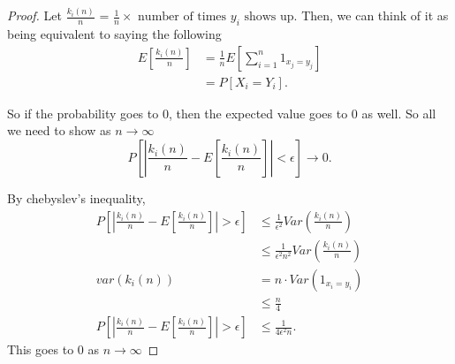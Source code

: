 \documentclass[a4paper]{article}
\begin{document}
  \begin{proof}
    Let $\frac{k_i(n)}{n}$ = $\frac{1}{n} \times \text{ number of times $y_i$ shows up}$. Then, we can think of it as being equivalent to saying the following
    \begin{align*}
      E[\frac{k_i(n)}{n}] &= \frac{1}{n} E[\sum_{i=1}^{n} 1_{x_j = y_j}] \\
                          &= P[X_i = Y_i] 
    .\end{align*}

    So if the probability goes to 0, then the expected value goes to 0 as well. So all we need to show as $n \to \infty$
    \[
      P[|\frac{k_i(n)}{n} - E[\frac{k_i(n)}{n}]| < \epsilon] \to 0 
    .\] 

    By chebyslev's inequality,
    \begin{align*}
      P[|\frac{k_i(n)}{n} - E[\frac{k_i(n)}{n}]| > \epsilon] &\leq \frac{1}{\epsilon^{2}} Var(\frac{k_i(n)}{n}) \\
                                                             &\leq \frac{1}{\epsilon^{2}n^{2}} Var(\frac{k_i(n)}{n})\\
      var(k_i(n)) &= n \cdot Var(1_{x_i = y_i}) \\
                  &\leq \frac{n}{4} \\
      P[|\frac{k_i(n)}{n} - E[\frac{k_i(n)}{n}]| > \epsilon] &\leq \frac{1}{4\epsilon^{2}n} 
    .\end{align*}
    This goes to $0$ as  $n \to \infty$
  \end{proof}
\end{document}
